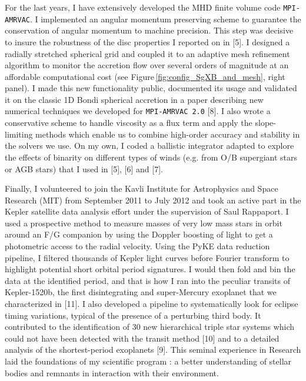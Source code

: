\documentclass[11pt,onecolumn]{article}
\makeatletter
\newcommand*{\eg}{e.g.\@\xspace}
\makeatother
\begin{document}
\normalsize

For the last years, I have extensively developed the MHD finite volume code \texttt{MPI-AMRVAC}. I implemented an angular momentum preserving scheme to guarantee the conservation of angular momentum to machine precision. This step was decisive to insure the robustness of the disc properties I reported on in [5]. I designed a radially stretched spherical grid and coupled it to an adaptive mesh refinement algorithm to monitor the accretion flow over several orders of magnitude at an affordable computational cost (see Figure\,\ref{fig:config_SgXB_and_mesh}, right panel). I made this new functionality public, documented its usage and validated it on the classic 1D Bondi spherical accretion in a paper describing new numerical techniques we developed for \texttt{MPI-AMRVAC 2.0} [8]. I also wrote a conservative scheme to handle viscosity as a flux term and apply the slope-limiting methods which enable us to combine high-order accuracy and stability in the solvers we use. On my own, I coded a ballistic integrator adapted to explore the effects of binarity on different types of winds (\eg from O/B supergiant stars or AGB stars) that I used in [5], [6] and [7].


Finally, I volunteered to join the Kavli Institute for Astrophysics and Space Research (MIT) from September 2011 to July 2012 and took an active part in the Kepler satellite data analysis effort under the supervision of Saul Rappaport. I used a prospective method to measure masses of very low mass stars in orbit around an F/G companion by using the Doppler boosting of light to get a photometric access to the radial velocity. Using the PyKE data reduction pipeline, I filtered thousands of Kepler light curves before Fourier transform to highlight potential short orbital period signatures. I would then fold and bin the data at the identified period, and that is how I ran into the peculiar transits of Kepler-1520b, the first disintegrating and super-Mercury exoplanet that we characterized in [11]. I also developed a pipeline to systematically look for eclipse timing variations, typical of the presence of a perturbing third body. It contributed to the identification of 30 new hierarchical triple star systems which could not have been detected with the transit method [10] and to a detailed analysis of the shortest-period exoplanets [9]. This seminal experience in Research laid the foundations of my scientific program : a better understanding of stellar bodies and remnants in interaction with their environment.
\end{document}
